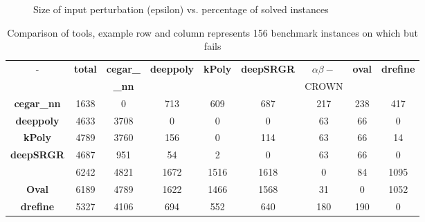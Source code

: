 

\begin{figure}[t]

    \caption{Size of input perturbation (epsilon) vs. percentage of solved instances}
    \label{res:ep:milp_with_milp}
\end{figure}

\begin{table}[b]
  \footnotesize
    \centering
    \begin{tabular}{|c|c|c|c|c|c|c|c|c|}
        \hline
      - & \textbf{total} & \textbf{cegar\_} & \textbf{deeppoly} & \textbf{kPoly} & \textbf{deepSRGR} & $\alpha \beta-$ & \textbf{oval} & \textbf{drefine} \\
        &     & \textbf{\_nn}& & & & \textsc{CROWN}& & \\
        \hline
        \textbf{cegar\_nn} & 1638 & 0 & 713 & 609 & 687 & 217 & 238 & 417 \\ 
        \hline
        \textbf{deeppoly} & 4633 & 3708 & 0 & 0 & 0 & 63 & 66 & 0  \\ 
        \hline
        \textbf{kPoly} & 4789 & 3760 & 156 & 0 & 114 & 63 & 66 & 14  \\ 
        \hline
        \textbf{deepSRGR} & 4687 & 951 & 54 & 2 & 0 & 63 & 66 & 0 \\ 
        \hline
        \alphabeta{} & 6242 & 4821 & 1672 & 1516 & 1618 & 0 & 84 & 1095  \\
        \hline
        \textbf{Oval} & 6189 & 4789 & 1622 & 1466 & 1568 & 31 & 0 & 1052 \\
        \hline
        \textbf{drefine} & 5327 & 4106 & 694 & 552 & 640 & 180 & 190 & 0  \\
        \hline
    \end{tabular}
    \caption{Comparison of tools, example row \kpoly{} and column \deeppoly{} represents 156 benchmark instances on which \kpoly{} but \deeppoly{} fails}
    \label{tb:matrix}
\end{table}




